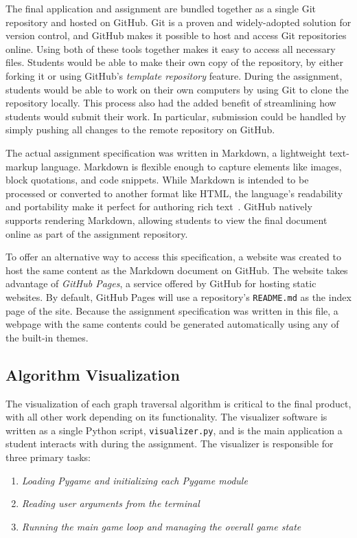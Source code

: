 \documentclass[pageno]{jpaper}
\begin{document}
The final application and assignment are bundled together as a single Git repository and hosted on GitHub. Git is a proven and widely-adopted solution for version control, and GitHub makes it possible to host and access Git repositories online. Using both of these tools together makes it easy to access all necessary files. Students would be able to make their own copy of the repository, by either forking it or using GitHub's \emph{template repository} feature. During the assignment, students would be able to work on their own computers by using Git to clone the repository locally. This process also had the added benefit of streamlining how students would submit their work. In particular, submission could be handled by simply pushing all changes to the remote repository on GitHub.

The actual assignment specification was written in Markdown, a lightweight text-markup language. Markdown is flexible enough to capture elements like images, block quotations, and code snippets. While Markdown is intended to be processed or converted to another format like HTML, the language's readability and portability make it perfect for authoring rich text~\cite{markdown}. GitHub natively supports rendering Markdown, allowing students to view the final document online as part of the assignment repository. 

To offer an alternative way to access this specification, a website was created to host the same content as the Markdown document on GitHub. The website takes advantage of \emph{GitHub Pages}, a service offered by GitHub for hosting static websites. By default, GitHub Pages will use a repository's \texttt{README.md} as the index page of the site. Because the assignment specification was written in this file, a webpage with the same contents could be generated automatically using any of the built-in themes.

\subsection{ Algorithm Visualization}

The visualization of each graph traversal algorithm is critical to the final product, with all other work depending on its functionality. The visualizer software is written as a single Python script, \texttt{visualizer.py}, and is the main application a student interacts with during the assignment. The visualizer is responsible for three primary tasks:

\begin{enumerate}[label=\textbf{\arabic*.},leftmargin=3cm,font=\textnormal]
\item \emph{Loading Pygame and initializing each Pygame module}
\item \emph{Reading user arguments from the terminal}
\item \emph{Running the main game loop and managing the overall game state}
\end{enumerate}
\end{document}
